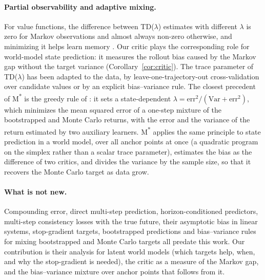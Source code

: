 \paragraph{Partial observability and adaptive mixing.}
For value functions, the difference between TD($\lambda$) estimates with different $\lambda$ is zero for Markov observations and almost always non-zero otherwise, and minimizing it helps learn memory \citep{allen2024lambda}. Our critic plays the corresponding role for world-model state prediction: it measures the rollout bias caused by the Markov gap without the target variance (Corollary~\ref{cor:critic}). The trace parameter of TD($\lambda$) has been adapted to the data, by leave-one-trajectory-out cross-validation over candidate values \citep{mann2016adaptive} or by an explicit bias--variance rule. The closest precedent of M\textsuperscript{*} is the greedy rule of \citet{white2016greedy}: it sets a state-dependent $\lambda = \mathrm{err}^2 / (\mathrm{Var} + \mathrm{err}^2)$, which minimizes the mean squared error of a one-step mixture of the bootstrapped and Monte Carlo returns, with the error and the variance of the return estimated by two auxiliary learners. M\textsuperscript{*} applies the same principle to state prediction in a world model, over all anchor points at once (a quadratic program on the simplex rather than a scalar trace parameter), estimates the bias as the difference of two critics, and divides the variance by the sample size, so that it recovers the Monte Carlo target as data grow.

\paragraph{What is not new.}
Compounding error, direct multi-step prediction, horizon-conditioned predictors, multi-step consistency losses with the true future, their asymptotic bias in linear systems, stop-gradient targets, bootstrapped predictions and bias--variance rules for mixing bootstrapped and Monte Carlo targets all predate this work. Our contribution is their analysis for latent world models (which targets help, when, and why the stop-gradient is needed), the critic as a measure of the Markov gap, and the bias--variance mixture over anchor points that follows from it.
